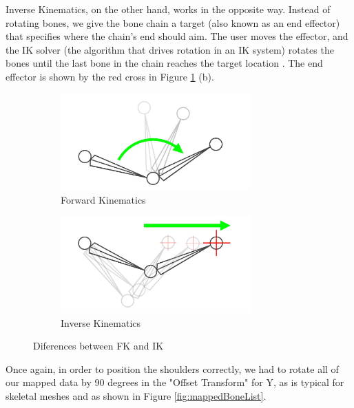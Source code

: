 Inverse Kinematics, on the other hand, works in the opposite way. Instead of rotating bones, we give the bone chain a target (also known as an end effector) that specifies where the chain's end should aim. The user moves the effector, and the IK solver (the algorithm that drives rotation in an IK system) rotates the bones until the last bone in the chain reaches the target location \cite{IK}. The end effector is shown by the red cross in Figure \ref{fig:kinematics} (b).

\begin{figure}[!htb]
    \begin{minipage}{\linewidth}
        \centering
        \begin{subfigure}{0.49\textwidth}
            \centering
            \includegraphics[width=0.8\textwidth]{figures/diagram_FK.png}
            \caption{Forward Kinematics \cite{IK}}
        \end{subfigure}
        \begin{subfigure}{0.49\textwidth}
            \includegraphics[width=0.8\textwidth]{figures/diagramIK.png}
            \centering
            \caption{Inverse Kinematics \cite{IK}}
        \end{subfigure}
        \caption{Diferences between FK and IK}
        \label{fig:kinematics}
	\end{minipage}
\end{figure}

Once again, in order to position the shoulders correctly, we had to rotate all of our mapped data by 90 degrees in the "Offset Transform" for Y, as is typical for skeletal meshes and as shown in Figure \ref{fig:mappedBoneList}.

